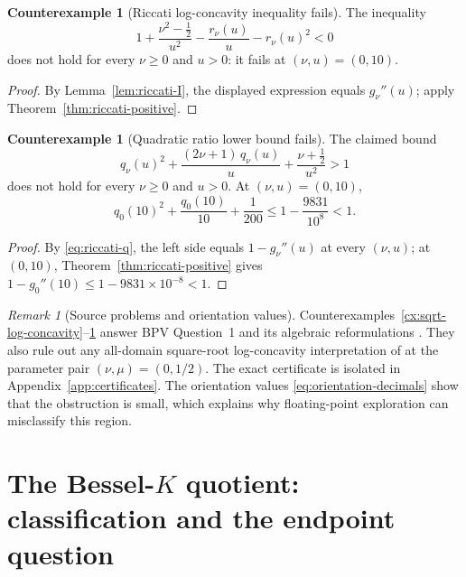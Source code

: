 \documentclass[preprint,12pt]{elsarticle}
\theoremstyle{plain}
\theoremstyle{definition}
\newtheorem{counterexample}[theorem]{Counterexample}
\theoremstyle{remark}
\newtheorem{remark}[theorem]{Remark}
\begin{document}
\begin{counterexample}[Riccati log-concavity inequality fails]
\label{cx:riccati-inequality}
The inequality
\begin{equation}
1+\frac{\nu^2-\frac12}{u^2}-\frac{r_\nu(u)}{u}-r_\nu(u)^2<0
\end{equation}
does not hold for every \(\nu\ge0\) and \(u>0\): it fails at
\((\nu,u)=(0,10)\).
\end{counterexample}
\begin{proof}
By Lemma~\ref{lem:riccati-I}, the displayed expression equals
\(g_\nu''(u)\); apply Theorem~\ref{thm:riccati-positive}.
\end{proof}

\begin{counterexample}[Quadratic ratio lower bound fails]
\label{cx:quadratic-bound}
The claimed bound
\begin{equation}
q_\nu(u)^2+\frac{(2\nu+1)\,q_\nu(u)}{u}+\frac{\nu+\frac12}{u^2}>1
\end{equation}
does not hold for every \(\nu\ge0\) and \(u>0\). At \((\nu,u)=(0,10)\),
\begin{equation}
q_0(10)^2+\frac{q_0(10)}{10}+\frac{1}{200}
\le1-\frac{9831}{10^8}<1.
\end{equation}
\end{counterexample}
\begin{proof}
By \eqref{eq:riccati-q}, the left side equals \(1-g_\nu''(u)\) at every
\((\nu,u)\); at \((0,10)\), Theorem~\ref{thm:riccati-positive} gives
\(1-g_0''(10)\le1-9831\times10^{-8}<1\).
\end{proof}



\begin{remark}[Source problems and orientation values]
Counterexamples~\ref{cx:sqrt-log-concavity}--\ref{cx:quadratic-bound} answer
BPV Question~1 and its algebraic reformulations \cite{bpv}. They also rule out
any all-domain square-root log-concavity interpretation of
\cite[Theorem~4]{nanthanasub} at the parameter pair \((\nu,\mu)=(0,1/2)\).
The exact certificate is isolated in
Appendix~\ref{app:certificates}. The orientation values
\eqref{eq:orientation-decimals} show that the obstruction is small, which
explains why floating-point exploration can misclassify this region.
\end{remark}

\section{The Bessel-\texorpdfstring{\(K\)}{K} quotient: classification and
the endpoint question}
\label{sec:besselk}
\end{document}
